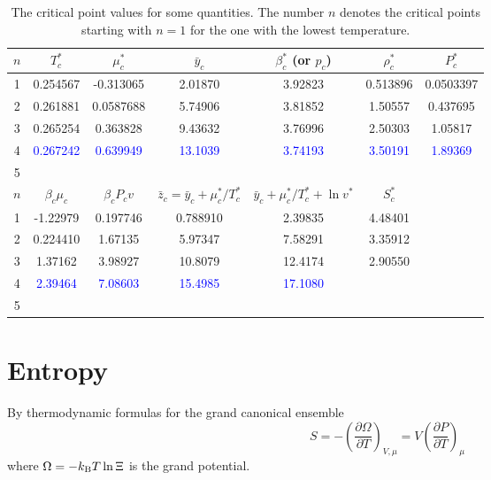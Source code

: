 \documentclass[12pt]{article}
\numberwithin{equation}{section}
\begin{document}
	\begin{table}[h]
		\centering
		\caption{The critical point values for some quantities. The number $n$ denotes the critical points starting with $n=1$ for the one with the lowest temperature.}
		\begin{tabular}{|c|c|c|c|c|c|c|}
			\hline
			$n$ & $T^*_c$ & $\mu^*_c$ & $\bar{y}_c$ & $\beta^*_c$ (or $p_c$) & $\rho^*_c$ & $P^*_c$ \\
			\hline
			1 & 0.254567 & -0.313065 & 2.01870 & 3.92823 & 0.513896 & 0.0503397  \\
			2 & 0.261881 & 0.0587688 & 5.74906 & 3.81852 & 1.50557 & 0.437695  \\
			3 & 0.265254 & 0.363828 & 9.43632 & 3.76996 & 2.50303 & 1.05817 \\
			4 & \textcolor{blue}{0.267242} & \textcolor{blue}{0.639949} & \textcolor{blue}{13.1039} & \textcolor{blue}{3.74193} & \textcolor{blue}{3.50191} & \textcolor{blue}{1.89369} \\
			5 & & & & & & \\
			\hline
			$n$ & $\beta_c\mu_c$ & $\beta_c P_c v$ & $\bar{z}_c=\bar{y}_c+\mu^*_c/T^*_c$ & $\bar{y}_c+\mu^*_c/T^*_c + \ln v^*$ & $S^*_c$ & \\
			\hline
			1 & -1.22979 & 0.197746 & 0.788910 & 2.39835 & 4.48401 & \\
			2 & 0.224410 & 1.67135 & 5.97347 & 7.58291 & 3.35912 & \\
			3 & 1.37162 & 3.98927 & 10.8079 & 12.4174 & 2.90550 & \\
			4 & \textcolor{blue}{2.39464}  & \textcolor{blue}{7.08603}& \textcolor{blue}{15.4985} & \textcolor{blue}{17.1080} & & \\
			5 &  & & & & & \\
			\hline
		\end{tabular}
		\label{tab:cp}
	\end{table}
	
	\pagebreak
	\section{Entropy}
	By thermodynamic formulas for the grand canonical ensemble
	\begin{equation}
		S = -\left(\frac{\partial \Omega}{\partial T}\right)_{V,\mu} = V\left(\frac{\partial P}{\partial T}\right)_{\mu}
	\end{equation}
	where $\Omega = -k_{\rm B}T \ln \Xi$ is the grand potential. 
	
\end{document}
